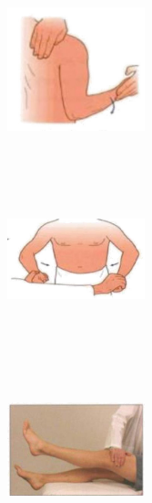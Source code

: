 \documentclass[a4paper,12pt,openany,twoside]{book}
\begin{document}
{\begin{figure}[H]
\begin{subfigure}[t]{.25\textwidth}
		\end{subfigure}
		\hspace{\fill}
		\begin{subfigure}[t]{.25\textwidth}
			\includegraphics[width=4cm,height=5cm]{./clinicalPhysioPic/motorSystem/infraspinatus.jpg}
		\end{subfigure}
		\hspace{\fill}
		\begin{subfigure}[t]{.25\textwidth}
			\includegraphics[width=4cm,height=5cm]{./clinicalPhysioPic/motorSystem/pectoralisMajor.jpg}
		\end{subfigure}
		\hspace{\fill}
		\begin{subfigure}[t]{.25\textwidth}
			\includegraphics[width=4cm,height=5cm]{./clinicalPhysioPic/motorSystem/hipFlexion.jpg}
		\end{subfigure}
		\hspace{\fill}

\end{figure}}
\end{document}
